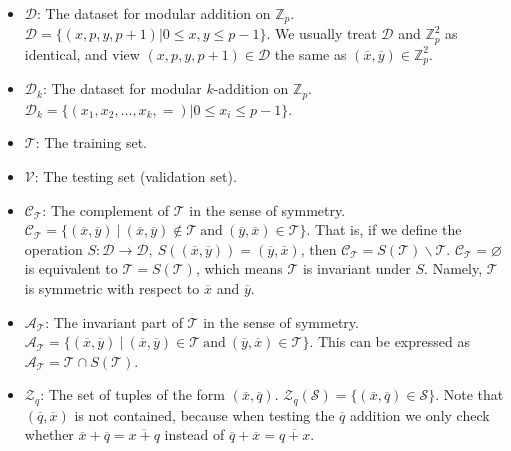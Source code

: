 \documentclass{article}
\begin{document}
\begin{itemize}
    \item $\mathcal{D}$: The dataset for modular addition on $\mathbb{Z}_p$. $\mathcal{D} = \lbrace \left( x, p, y, p+1\right)\left.\right| 0 \leqslant x, y\leqslant p-1\rbrace$. We usually treat $\mathcal{D}$ and $\mathbb{Z}_p^2$ as identical, and view $\left( x, p, y, p+1\right) \in \mathcal{D}$ the same as $(\overline{x}, \overline{y}) \in \mathbb{Z}_p^2$.

    \item $\mathcal{D}_k$: The dataset for modular $k$-addition on $\mathbb{Z}_p$. $\mathcal{D}_k = \lbrace \left(x_1, x_2,\dots, x_k, =\right) \left.\right| 0 \leqslant x_i \leqslant p-1\rbrace$.

    \item $\mathcal{T}$: The training set.

    \item $\mathcal{V}$: The testing set (validation set).

    \item $\mathcal{C_T}$: The complement of $\mathcal{T}$ in the sense of symmetry. $\mathcal{C_T} = \lbrace \left.(\overline{x}, \overline{y})\ \right|\ (\overline{x}, \overline{y}) \notin \mathcal{T}\ \text{and}\ (\overline{y}, \overline{x}) \in \mathcal{T}\rbrace$. That is, if we define the operation $S: \mathcal{D} \to \mathcal{D},\ S((\overline{x}, \overline{y})) = (\overline{y}, \overline{x})$, then $\mathcal{C_T} = S(\mathcal{T}) \backslash \mathcal{T}$. $\mathcal{C_T} = \varnothing$ is equivalent to $\mathcal{T} = S(\mathcal{T})$, which means $\mathcal{T}$ is invariant under $S$. Namely, $\mathcal{T}$ is symmetric with respect to $\overline{x}$ and $\overline{y}$.

    \item $\mathcal{A_T}$: The invariant part of $\mathcal{T}$ in the sense of symmetry. $\mathcal{A_T} = \lbrace\left.(\overline{x}, \overline{y})\ \right|\ (\overline{x}, \overline{y}) \in \mathcal{T}\ \text{and}\ (\overline{y}, \overline{x}) \in \mathcal{T}\rbrace$. This can be expressed as $\mathcal{A_T} = \mathcal{T}\cap S(\mathcal{T})$.

    \item $\mathcal{Z}_q$: The set of tuples of the form $(\overline{x}, \overline{q})$. $\mathcal{Z}_q(\mathcal{S}) = \lbrace(\overline{x},\overline{q}) \in \mathcal{S}\rbrace$. Note that $(\overline{q}, \overline{x})$ is not contained, because when testing the $\overline{q}$ addition we only check whether $\overline{x} +\overline{q} = \overline{x+q}$ instead of $\overline{q} + \overline{x} = \overline{q+x}$.
\end{itemize}
\end{document}
